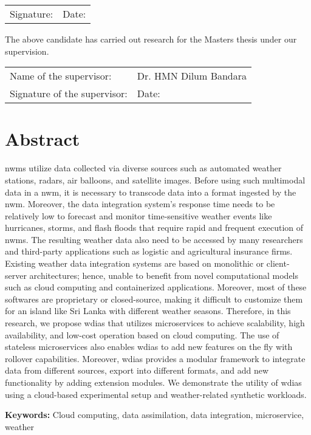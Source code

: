 \documentclass[a4paper,oneside,12pt]{report}
\begin{document}
\vspace{0.5in}
\noindent
\begin{tabu} to 1.0\textwidth { X[6.5,l] X[3.5,l] }
  Signature: & Date:
\end{tabu}



\vspace{0.5in}
\noindent
The above candidate has carried out research for the Masters thesis under our supervision.


\vspace{0.5in}
\noindent
\begin{tabu} to 1.0\textwidth { X[6.5,l] X[3.5,l] }
  Name of the supervisor: & Dr. HMN Dilum Bandara\\ [2.5ex]
  Signature of the supervisor: & Date:
\end{tabu}

\restoregeometry
\normalsize

{ 

\chapter*{Abstract}

\acrfull{nwm}s utilize data collected via diverse sources such as automated weather stations, radars, air balloons, and satellite images. Before using such multimodal data in a \acrshort{nwm}, it is necessary to transcode data into a format ingested by the \acrshort{nwm}. Moreover, the data integration system's response time needs to be relatively low to forecast and monitor time-sensitive weather events like hurricanes, storms, and flash floods that require rapid and frequent execution of \acrshort{nwm}s. The resulting weather data also need to be accessed by many researchers and third-party applications such as logistic and agricultural insurance firms.
Existing weather data integration systems are based on monolithic or client-server architectures; hence, unable to benefit from novel computational models such as cloud computing and containerized applications. Moreover, most of these softwares are proprietary or closed-source, making it difficult to customize them for an island like Sri Lanka with different weather seasons.
Therefore, in this research, we propose \acrfull{wdias} that utilizes microservices to achieve scalability, high availability, and low-cost operation based on cloud computing. The use of stateless microservices also enables \acrshort{wdias} to add new features on the fly with rollover capabilities. Moreover, \acrshort{wdias} provides a modular framework to integrate data from different sources, export into different formats, and add new functionality by adding extension modules.
We demonstrate the utility of \acrshort{wdias} using a cloud-based experimental setup and weather-related synthetic workloads.

\vspace{4mm}

\textbf{Keywords:} Cloud computing, data assimilation, data integration, microservice, weather
}
\end{document}
